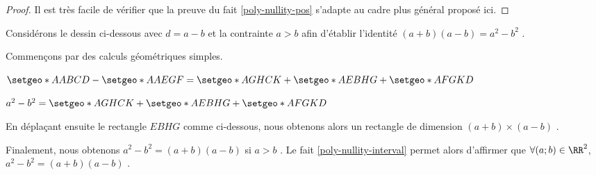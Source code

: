 \begin{proof}
	Il est très facile de vérifier que la preuve du fait \ref{poly-nullity-pos} s'adapte au cadre plus général proposé ici.
\end{proof}




\medskip

\begin{example}
Considérons le dessin ci-dessous avec $d = a - b$ et la contrainte $a > b$ afin d'établir l'identité $(a+b)(a-b) = a^2 - b^2$ .


\smallskip

\begin{center}
\end{center}


\medskip


Commençons par des calculs géométriques simples.

\smallskip
	
$\setgeo*{A}{ABCD} - \setgeo*{A}{AEGF} = \setgeo*{A}{GHCK} + \setgeo*{A}{EBHG} + \setgeo*{A}{FGKD}$
	
\smallskip
	
$a^2 - b^2 = \setgeo*{A}{GHCK} + \setgeo*{A}{EBHG} + \setgeo*{A}{FGKD}$


\medskip

En déplaçant ensuite le rectangle $EBHG$ comme ci-dessous, nous obtenons alors un rectangle de dimension $(a+b) \times (a-b)$ . 
	

\smallskip

\begin{center}
\end{center}


\medskip

Finalement, nous obtenons $a^2 - b^2 = (a+b)(a-b)$ si $a > b$ .
Le fait \ref{poly-nullity-interval} permet alors d'affirmer que $\forall (a ;b) \in \RR^2$, $a^2 - b^2 = (a+b)(a-b)$ .
\end{example}
